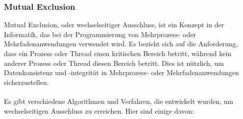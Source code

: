 \subsubsection{Mutual Exclusion}
Mutual Exclusion, oder wechselseitiger Ausschluss, ist ein Konzept in der Informatik, das bei der Programmierung von Mehrprozess- oder Mehrfadenanwendungen verwendet wird. Es bezieht sich auf die Anforderung, dass ein Prozess oder Thread einen kritischen Bereich betritt, während kein anderer Prozess oder Thread diesen Bereich betritt. Dies ist nützlich, um Datenkonsistenz und -integrität in Mehrprozess- oder Mehrfadenanwendungen sicherzustellen.
\\\\
Es gibt verschiedene Algorithmen und Verfahren, die entwickelt wurden, um wechselseitigen Ausschluss zu erreichen. Hier sind einige davon:
